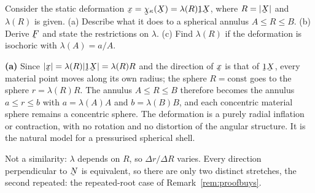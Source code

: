 \begin{problem}
Consider the static deformation $\bx=\bchi_{\kappa}(\bX)=\lambda(R)\shift
\bX$, where $R=|\bX|$ and $\lambda(R)$ is given.
(a) Describe what it does to a spherical annulus $A\le R\le B$.
(b) Derive $\bF$ and state the restrictions on $\lambda$.
(c) Find $\lambda(R)$ if the deformation is isochoric with
$\lambda(A)=a/A$.
\end{problem}

\begin{solution}
\textbf{(a)} Since $|\bx|=\lambda(R)|\shift\bX|=\lambda(R)R$ and the
direction of $\bx$ is that of $\shift\bX$, every material point moves
along its own radius; the sphere $R=\text{const}$ goes to the sphere
$r=\lambda(R)R$. The annulus $A\le R\le B$ therefore becomes the annulus
$a\le r\le b$ with $a=\lambda(A)A$ and $b=\lambda(B)B$, and each concentric
material sphere remains a concentric sphere. The deformation is a purely
radial inflation or contraction, with no rotation and no distortion of
the angular structure. It is the natural model for a pressurised spherical
shell.

Not a similarity: $\lambda$ depends on $R$, so $\Delta r/\Delta R$ varies.
Every direction perpendicular to $\bN$ is equivalent, so there are only
two distinct stretches, the second repeated: the repeated-root case of
Remark~\ref{rem:proofbuys}.


\end{solution}

